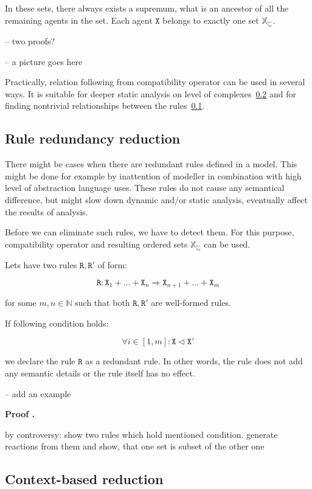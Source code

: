 \documentclass[12pt]{fithesis2}
\newcounter{counter}[section]
\renewcommand{\thecounter}{\thesection.\arabic{counter}}
\newenvironment{proof}{\bigskip\refstepcounter{counter}\noindent\textbf{Proof \thecounter}\par\nopagebreak}{\bigskip}
\begin{document}
In these sets, there always exists a supremum, what is an ancestor of all the remaining agents in the set. Each agent $\mathtt{X}$ belongs to exactly one set $\mathds{X}_\sqsubseteq$.

-- two proofs?

-- a picture goes here

Practically, relation following from compatibility operator can be used in several ways. It is suitable for deeper static analysis on level of complexes~\ref{context_reduction} and for finding nontrivial relationships between the rules~\ref{rule_redundancy}.

\subsection{Rule redundancy reduction}
\label{rule_redundancy}

There might be cases when there are redundant rules defined in a model. This might be done for example by inattention of modeller in combination with high level of abstraction language uses. These rules do not cause any semantical difference, but might slow down dynamic and/or static analysis, eventually affect the results of analysis.

Before we can eliminate such rules, we have to detect them. For this purpose, compatibility operator and resulting ordered sets $\mathds{X}_\sqsubseteq$ can be used.

Lets have two rules $\mathtt{R}, \mathtt{R}'$ of form:

$$ \mathtt{R}: \mathtt{X}_1 + \ldots + \mathtt{X}_n \Rightarrow \mathtt{X}_{n+1} + \ldots + \mathtt{X}_{m} $$

for some $m,n \in \mathbb{N}$ such that both $\mathtt{R}, \mathtt{R}'$ are well-formed rules.

If following condition holds:

$$ \forall i \in [ 1, m ]: \mathtt{X} \lhd \mathtt{X}' $$

we declare the rule $\mathtt{R}$ as a redundant rule. In other words, the rule does not add any semantic details or the rule itself has no effect.

-- add an example

\begin{proof}
{by controversy: show two rules which hold mentioned condition. generate reactions from them and show, that one set is subset of the other one}
\end{proof}

\subsection{Context-based reduction}
\label{context_reduction}
\end{document}
